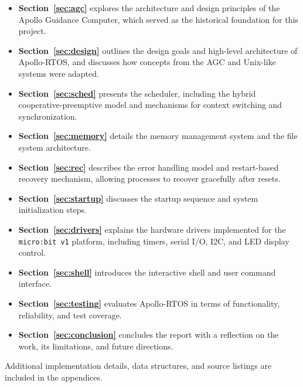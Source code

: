 \begin{itemize}
    \item \textbf{Section~\ref{sec:agc}} explores the architecture and design
        principles of the Apollo Guidance Computer, which served as the historical
        foundation for this project.
    \item \textbf{Section~\ref{sec:design}} outlines the design goals and high-level
        architecture of Apollo-RTOS, and discusses how concepts from the AGC and
        Unix-like systems were adapted.
    \item \textbf{Section~\ref{sec:sched}} presents the scheduler, including the hybrid
        cooperative-preemptive model and mechanisms for context switching and
        synchronization.
    \item \textbf{Section~\ref{sec:memory}} details the memory management system and
        the file system architecture.
    \item \textbf{Section~\ref{sec:rec}} describes the error handling model and
        restart-based recovery mechanism, allowing processes to recover gracefully
        after resets.
    \item \textbf{Section~\ref{sec:startup}} discusses the startup sequence and system
        initialization steps.
    \item \textbf{Section~\ref{sec:drivers}} explains the hardware drivers implemented
        for the \texttt{micro:bit v1} platform, including timers, serial I/O, I2C, and
        LED display control.
    \item \textbf{Section~\ref{sec:shell}} introduces the interactive shell and user
        command interface.
    \item \textbf{Section~\ref{sec:testing}} evaluates Apollo-RTOS in terms of
        functionality, reliability, and test coverage.
    \item \textbf{Section~\ref{sec:conclusion}} concludes the report with a reflection
        on the work, its limitations, and future directions.
\end{itemize}

Additional implementation details, data structures, and source listings are included in
the appendices.


